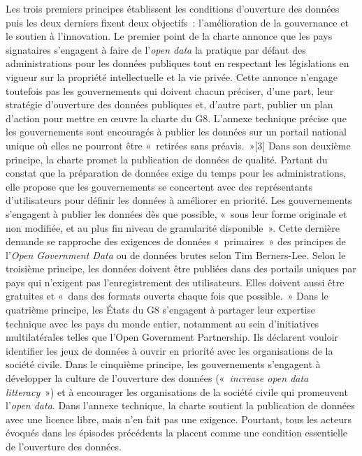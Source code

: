 \documentclass[]{book}
\theoremstyle{definition}
\theoremstyle{definition}
\theoremstyle{definition}
\theoremstyle{remark}
\begin{document}
Les trois premiers principes établissent les conditions d'ouverture des
données puis les deux derniers fixent deux objectifs~: l'amélioration de
la gouvernance et le soutien à l'innovation. Le premier point de la
charte annonce que les pays signataires s'engagent à faire de
l'\emph{open data} la pratique par défaut des administrations pour les
données publiques tout en respectant les législations en vigueur sur la
propriété intellectuelle et la vie privée. Cette annonce n'engage
toutefois pas les gouvernements qui doivent chacun préciser, d'une part,
leur stratégie d'ouverture des données publiques et, d'autre part,
publier un plan d'action pour mettre en œuvre la charte du G8. L'annexe
technique précise que les gouvernements sont encouragés à publier les
données sur un portail national unique où elles ne pourront être
«~retirées sans préavis.~»{[}3{]} Dans son deuxième principe, la charte
promet la publication de données de qualité. Partant du constat que la
préparation de données exige du temps pour les administrations, elle
propose que les gouvernements se concertent avec des représentants
d'utilisateurs pour définir les données à améliorer en priorité. Les
gouvernements s'engagent à publier les données dès que possible, «~sous
leur forme originale et non modifiée, et au plus fin niveau de
granularité disponible~». Cette dernière demande se rapproche des
exigences de données «~primaires~» des principes de l'\emph{Open
Government Data} ou de données brutes selon Tim Berners-Lee. Selon le
troisième principe, les données doivent être publiées dans des portails
uniques par pays qui n'exigent pas l'enregistrement des utilisateurs.
Elles doivent aussi être gratuites et «~dans des formats ouverts chaque
fois que possible.~» Dans le quatrième principe, les États du G8
s'engagent à partager leur expertise technique avec les pays du monde
entier, notamment au sein d'initiatives multilatérales telles que l'Open
Government Partnership. Ils déclarent vouloir identifier les jeux de
données à ouvrir en priorité avec les organisations de la société
civile. Dans le cinquième principe, les gouvernements s'engagent à
développer la culture de l'ouverture des données («~\emph{increase open
data litteracy}~») et à encourager les organisations de la société
civile qui promeuvent l'\emph{open data}. Dans l'annexe technique, la
charte soutient la publication de données avec une licence libre, mais
n'en fait pas une exigence. Pourtant, tous les acteurs évoqués dans les
épisodes précédents la placent comme une condition essentielle de
l'ouverture des données.
\end{document}
